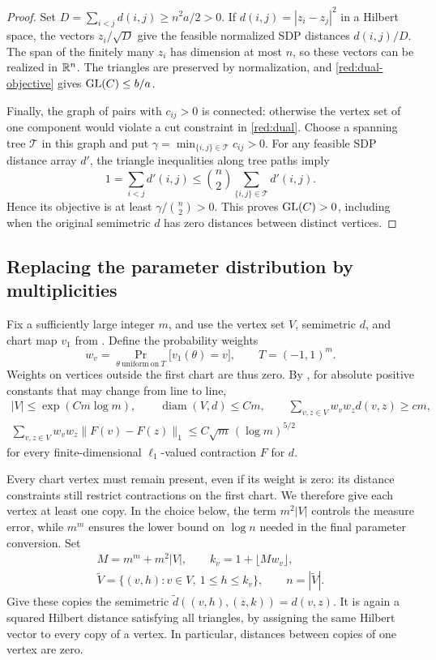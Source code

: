 \begin{proof}
Set $D=\sum_{i<j}d(i,j)\geq n^2a/2>0$.  If
$d(i,j)=|z_i-z_j|^2$ in a Hilbert space, the vectors
$z_i/\sqrt D$ give the feasible normalized SDP distances $d(i,j)/D$.
The span of the finitely many $z_i$ has dimension at most $n$, so these
vectors can be realized in $\mathbb R^n$.  The triangles are preserved by
normalization, and \eqref{red:dual-objective} gives
$\operatorname{GL}(C)\leq b/a$.

Finally, the graph of pairs with $c_{ij}>0$ is connected: otherwise the
vertex set of one component would violate a cut constraint in
\eqref{red:dual}.  Choose a spanning tree $\mathcal T$ in this graph
and put $\gamma=\min_{\{i,j\}\in\mathcal T}c_{ij}>0$.  For any feasible
SDP distance array $d'$, the triangle inequalities along tree paths
imply
\[
1=\sum_{i<j}d'(i,j)
\leq \binom n2\sum_{\{i,j\}\in\mathcal T}d'(i,j).
\]
Hence its objective is at least $\gamma/\binom n2>0$.  This proves
$\operatorname{GL}(C)>0$, including when the original semimetric $d$ has zero
distances between distinct vertices.
\end{proof}

\subsection{Replacing the parameter distribution by multiplicities}

Fix a sufficiently large integer $m$, and use the vertex set $V$,
semimetric $d$, and chart map $v_1$ from .  Define the
probability weights
\[
w_v=\Pr_{\theta\ \mathrm{uniform\ on}\ T}
\big[v_1(\theta)=v\big],
\qquad T=(-1,1)^m.
\]
Weights on vertices outside the first chart are thus zero.
By , for absolute positive constants
that may change from line to line,
\begin{equation}
\label{red:weighted-bounds}
\begin{gathered}
|V|\leq \exp(Cm\log m),\qquad
\operatorname{diam}(V,d)\leq Cm,\qquad
\sum_{v,z\in V}w_vw_zd(v,z)\geq cm,\\
\sum_{v,z\in V}w_vw_z\|F(v)-F(z)\|_1
\leq C\sqrt m\,(\log m)^{5/2}
\end{gathered}
\end{equation}
for every finite-dimensional $\ell_1$-valued contraction $F$ for $d$.

Every chart vertex must remain present, even if its weight is zero:
its distance constraints still restrict contractions on the first chart.
We therefore give each vertex at least one copy. In the choice below,
the term $m^2|V|$ controls the measure error, while $m^m$ ensures the
lower bound on $\log n$ needed in the final parameter conversion. Set
\[
\begin{gathered}
M=m^m+m^2|V|,
\qquad k_v=1+\lfloor Mw_v\rfloor,\\
\widetilde V=\{(v,h):v\in V,\ 1\leq h\leq k_v\},
\qquad n=|\widetilde V|.
\end{gathered}
\]
Give these copies the semimetric
$\widetilde d((v,h),(z,k))=d(v,z)$.
It is again a squared Hilbert distance satisfying all triangles, by
assigning the same Hilbert vector to every copy of a vertex.  In
particular, distances between copies of one vertex are zero.

